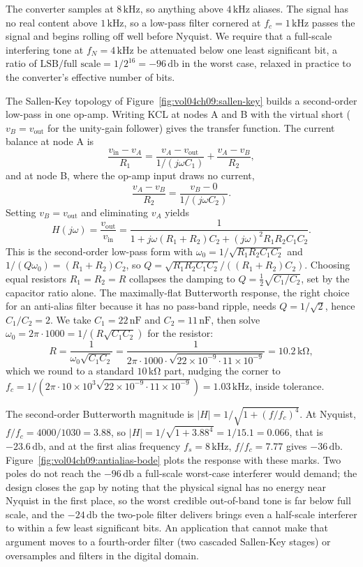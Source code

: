 The converter samples at $8\,\si{\kilo\hertz}$, so anything above
$4\,\si{\kilo\hertz}$ aliases. The signal has no real content above
$1\,\si{\kilo\hertz}$, so a low-pass filter cornered at $f_c =
1\,\si{\kilo\hertz}$ passes the signal and begins rolling off well before
Nyquist. We require that a full-scale interfering tone at $f_N =
4\,\si{\kilo\hertz}$ be attenuated below one least significant bit, a
ratio of $\text{LSB}/\text{full scale} = 1/2^{16} = -96\,\si{\decibel}$
in the worst case, relaxed in practice to the converter's effective
number of bits.

The Sallen-Key topology of Figure~\ref{fig:vol04ch09:sallen-key} builds
a second-order low-pass in one op-amp. Writing KCL at nodes A and B with
the virtual short ($v_B = v_{\text{out}}$ for the unity-gain follower)
gives the transfer function. The current balance at node A is
\[
\frac{v_{\text{in}}-v_A}{R_1} = \frac{v_A - v_{\text{out}}}{1/(j\omega C_1)}
+ \frac{v_A - v_B}{R_2},
\]
and at node B, where the op-amp input draws no current,
\[
\frac{v_A - v_B}{R_2} = \frac{v_B - 0}{1/(j\omega C_2)}.
\]
Setting $v_B = v_{\text{out}}$ and eliminating $v_A$ yields
\[
H(j\omega) = \frac{v_{\text{out}}}{v_{\text{in}}}
= \frac{1}{1 + j\omega(R_1+R_2)C_2 + (j\omega)^2 R_1 R_2 C_1 C_2}.
\]
This is the second-order low-pass form with $\omega_0 = 1/\sqrt{R_1 R_2
C_1 C_2}$ and $1/(Q\omega_0) = (R_1+R_2)C_2$, so $Q = \sqrt{R_1 R_2 C_1
C_2}/((R_1+R_2)C_2)$. Choosing equal resistors $R_1 = R_2 = R$ collapses
the damping to $Q = \tfrac{1}{2}\sqrt{C_1/C_2}$, set by the capacitor
ratio alone. The maximally-flat Butterworth response, the right choice
for an anti-alias filter because it has no pass-band ripple, needs $Q =
1/\sqrt{2}$, hence $C_1/C_2 = 2$. We take $C_1 = 22\,\si{\nano\farad}$
and $C_2 = 11\,\si{\nano\farad}$, then solve $\omega_0 = 2\pi\cdot
1000 = 1/(R\sqrt{C_1 C_2})$ for the resistor:
\[
R = \frac{1}{\omega_0\sqrt{C_1 C_2}}
= \frac{1}{2\pi\cdot 1000\cdot\sqrt{22\times 10^{-9}\cdot 11\times 10^{-9}}}
= 10.2\,\si{\kilo\ohm},
\]
which we round to a standard $10\,\si{\kilo\ohm}$ part, nudging the corner
to $f_c = 1/(2\pi\cdot 10\times 10^{3}\sqrt{22\times 10^{-9}\cdot 11
\times 10^{-9}}) = 1.03\,\si{\kilo\hertz}$, inside tolerance.

The second-order Butterworth magnitude is $|H| = 1/\sqrt{1+(f/f_c)^4}$.
At Nyquist, $f/f_c = 4000/1030 = 3.88$, so $|H| = 1/\sqrt{1 + 3.88^4} =
1/15.1 = 0.066$, that is $-23.6\,\si{\decibel}$, and at the first alias
frequency $f_s = 8\,\si{\kilo\hertz}$, $f/f_c = 7.77$ gives $-36\,\si{
\decibel}$. Figure~\ref{fig:vol04ch09:antialias-bode} plots the response
with these marks. Two poles do not reach the $-96\,\si{\decibel}$ a
full-scale worst-case interferer would demand; the design closes the gap
by noting that the physical signal has no energy near Nyquist in the
first place, so the worst credible out-of-band tone is far below full
scale, and the $-24\,\si{\decibel}$ the two-pole filter delivers brings
even a half-scale interferer to within a few least significant bits. An
application that cannot make that argument moves to a fourth-order filter
(two cascaded Sallen-Key stages) or oversamples and filters in the
digital domain.

